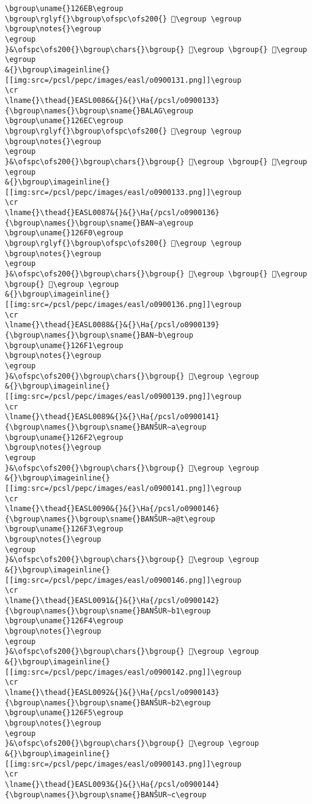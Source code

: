 \begin{verbatim}
\bgroup\uname{}126EB\egroup
\bgroup\rglyf{}\bgroup\ofspc\ofs200{} 𒛫\egroup \egroup
\bgroup\notes{}\egroup
\egroup
}&\ofspc\ofs200{}\bgroup\chars{}\bgroup{} 𒛪\egroup \bgroup{} 𒛫\egroup \egroup
&{}\bgroup\imageinline{}[[img:src=/pcsl/pepc/images/easl/o0900131.png]]\egroup
\cr
\lname{}\thead{}EASL0086&{}&{}\Ha{/pcsl/o0900133}{\bgroup\names{}\bgroup\sname{}BALAG\egroup
\bgroup\uname{}126EC\egroup
\bgroup\rglyf{}\bgroup\ofspc\ofs200{} 𒛬\egroup \egroup
\bgroup\notes{}\egroup
\egroup
}&\ofspc\ofs200{}\bgroup\chars{}\bgroup{} 𒛬\egroup \bgroup{} 𒛭\egroup \egroup
&{}\bgroup\imageinline{}[[img:src=/pcsl/pepc/images/easl/o0900133.png]]\egroup
\cr
\lname{}\thead{}EASL0087&{}&{}\Ha{/pcsl/o0900136}{\bgroup\names{}\bgroup\sname{}BAN∼a\egroup
\bgroup\uname{}126F0\egroup
\bgroup\rglyf{}\bgroup\ofspc\ofs200{} 𒛰\egroup \egroup
\bgroup\notes{}\egroup
\egroup
}&\ofspc\ofs200{}\bgroup\chars{}\bgroup{} 𒛮\egroup \bgroup{} 𒛯\egroup \bgroup{} 𒛰\egroup \egroup
&{}\bgroup\imageinline{}[[img:src=/pcsl/pepc/images/easl/o0900136.png]]\egroup
\cr
\lname{}\thead{}EASL0088&{}&{}\Ha{/pcsl/o0900139}{\bgroup\names{}\bgroup\sname{}BAN∼b\egroup
\bgroup\uname{}126F1\egroup
\bgroup\notes{}\egroup
\egroup
}&\ofspc\ofs200{}\bgroup\chars{}\bgroup{} 𒛱\egroup \egroup
&{}\bgroup\imageinline{}[[img:src=/pcsl/pepc/images/easl/o0900139.png]]\egroup
\cr
\lname{}\thead{}EASL0089&{}&{}\Ha{/pcsl/o0900141}{\bgroup\names{}\bgroup\sname{}BANŠUR∼a\egroup
\bgroup\uname{}126F2\egroup
\bgroup\notes{}\egroup
\egroup
}&\ofspc\ofs200{}\bgroup\chars{}\bgroup{} 𒛲\egroup \egroup
&{}\bgroup\imageinline{}[[img:src=/pcsl/pepc/images/easl/o0900141.png]]\egroup
\cr
\lname{}\thead{}EASL0090&{}&{}\Ha{/pcsl/o0900146}{\bgroup\names{}\bgroup\sname{}BANŠUR∼a@t\egroup
\bgroup\uname{}126F3\egroup
\bgroup\notes{}\egroup
\egroup
}&\ofspc\ofs200{}\bgroup\chars{}\bgroup{} 𒛳\egroup \egroup
&{}\bgroup\imageinline{}[[img:src=/pcsl/pepc/images/easl/o0900146.png]]\egroup
\cr
\lname{}\thead{}EASL0091&{}&{}\Ha{/pcsl/o0900142}{\bgroup\names{}\bgroup\sname{}BANŠUR∼b1\egroup
\bgroup\uname{}126F4\egroup
\bgroup\notes{}\egroup
\egroup
}&\ofspc\ofs200{}\bgroup\chars{}\bgroup{} 𒛴\egroup \egroup
&{}\bgroup\imageinline{}[[img:src=/pcsl/pepc/images/easl/o0900142.png]]\egroup
\cr
\lname{}\thead{}EASL0092&{}&{}\Ha{/pcsl/o0900143}{\bgroup\names{}\bgroup\sname{}BANŠUR∼b2\egroup
\bgroup\uname{}126F5\egroup
\bgroup\notes{}\egroup
\egroup
}&\ofspc\ofs200{}\bgroup\chars{}\bgroup{} 𒛵\egroup \egroup
&{}\bgroup\imageinline{}[[img:src=/pcsl/pepc/images/easl/o0900143.png]]\egroup
\cr
\lname{}\thead{}EASL0093&{}&{}\Ha{/pcsl/o0900144}{\bgroup\names{}\bgroup\sname{}BANŠUR∼c\egroup

\end{verbatim}

